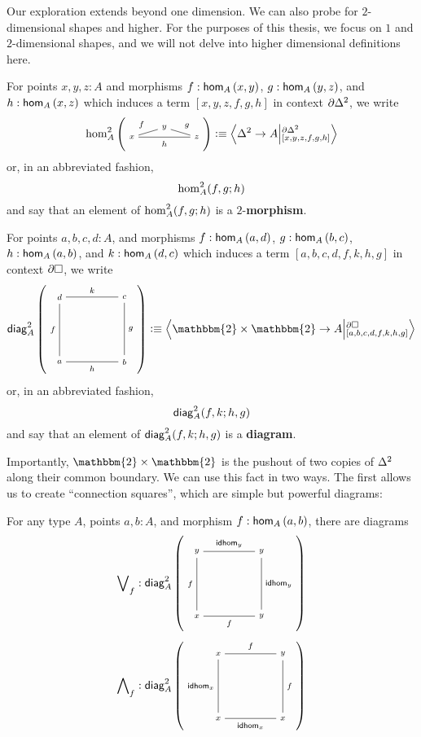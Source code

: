 \documentclass[main.tex]{subfiles}
\begin{document}
Our exploration extends beyond one dimension. We can also probe for $2$-dimensional shapes and higher. For the purposes of this thesis, we focus on $1$ and $2$-dimensional shapes, and we will not delve into higher dimensional definitions here.
\begin{definition}
    For points $x,y,z : A$ and morphisms $f : \ho[A]{x}{y}$, $g : \ho[A]{y}{z}$, and $h : \ho[A]{x}{z}$ which induces a term $[x,y,z,f,g,h]$ in context $\pardt$, we write
    $$\homtwo{A}(x,y,z,f,g,h) \defeq \ndexten{\tsx}{A}{\pardt}{[x,y,z,f,g,h]}$$
    or, in an abbreviated fashion,
    $$\homtwoshort{A}(x,y,z,f,g,h)$$
    and say that an element of $\homtwoshort{A}(x,y,z,f,g,h)$ is a $2$-\textbf{morphism}.
\end{definition}
\begin{definition}
    For points $a,b,c,d : A$, and morphisms $f : \ho[A]{a}{d}$, $g : \ho[A]{b}{c}$, $h : \ho[A]{a}{b}$, and $k : \ho[A]{d}{c}$ which induces a term \linebreak $[a,b,c,d,f,k,h,g]$ in context $\pards$, we write
    $$\diag{A}(a,b,c,d,f,k,h,g) \defeq \ndexten{\mathbbm{2}\times\mathbbm{2}}{A}{\pards}{[a,b,c,d,f,k,h,g]}$$
    or, in an abbreviated fashion,
    $$\diagshort{A}(a,b,c,d,f,k,h,g)$$
    and say that an element of $\diagshort{A}(a,b,c,d,f,k,h,g)$ is a \textbf{diagram}.
\end{definition}
Importantly, $\mathbbm{2} \times \mathbbm{2}$ is the pushout of two copies of $\tsx$ along their common boundary. We can use this fact in two ways. The first allows us to create ``connection squares'', which are simple but powerful diagrams:
\begin{lemma}
    For any type $A$, points $a,b:A$, and morphism $f : \ho[A]{a}{b}$, there are diagrams
    $$\bigvee\nolimits_f : \diag{A}(x,y,y,y,f,\idhom{y},f,\idhom{y})$$
    $$\bigwedge\nolimits_f : \diag{A}(x,x,y,x,\idhom{x},f,\idhom{x},f)$$
\end{lemma}
\end{document}
